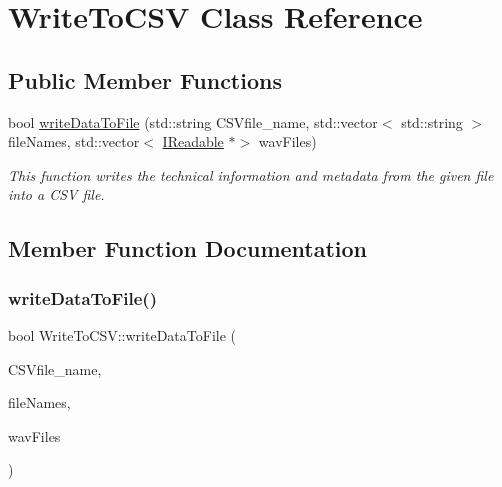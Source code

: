 \hypertarget{classWriteToCSV}{}\section{Write\+To\+C\+SV Class Reference}
\label{classWriteToCSV}
\subsection*{Public Member Functions}
\begin{DoxyCompactItemize}
\item 
bool \hyperlink{classWriteToCSV_ab2b17e10aff8b6abd3267def9e53592e}{write\+Data\+To\+File} (std\+::string C\+S\+Vfile\+\_\+name, std\+::vector$<$ std\+::string $>$ file\+Names, std\+::vector$<$ \hyperlink{classIReadable}{I\+Readable} $\ast$$>$ wav\+Files)
\begin{DoxyCompactList}\small\item\em This function writes the technical information and metadata from the given file into a C\+SV file. \end{DoxyCompactList}\end{DoxyCompactItemize}


\subsection{Member Function Documentation}
\mbox{\label{classWriteToCSV_ab2b17e10aff8b6abd3267def9e53592e}} 
\subsubsection{\texorpdfstring{write\+Data\+To\+File()}{writeDataToFile()}}
{\footnotesize\ttfamily bool Write\+To\+C\+S\+V\+::write\+Data\+To\+File (\begin{DoxyParamCaption}\item[{std\+::string}]{C\+S\+Vfile\+\_\+name,  }\item[{std\+::vector$<$ std\+::string $>$}]{file\+Names,  }\item[{std\+::vector$<$ \hyperlink{classIReadable}{I\+Readable} $\ast$$>$}]{wav\+Files }\end{DoxyParamCaption})}



